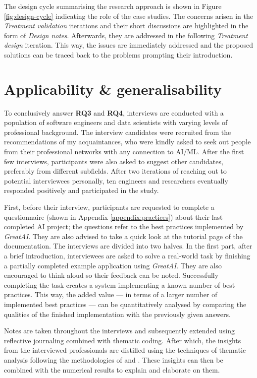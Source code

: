 The design cycle summarising the research approach is shown in Figure \ref{fig:design-cycle} indicating the role of the case studies. The concerns arisen in the \textit{Treatment validation} iterations and their short discussions are highlighted in the form of \textit{Design notes}. Afterwards, they are addressed in the following \textit{Treatment design} iteration. This way, the issues are immediately addressed and the proposed solutions can be traced back to the problems prompting their introduction.

\section{Applicability \& generalisability} \label{section:interview-setup}

To conclusively answer \textbf{RQ3} and \textbf{RQ4}, interviews are conducted with a population of software engineers and data scientists with varying levels of professional background. The interview candidates were recruited from the recommendations of my acquaintances, who were kindly asked to seek out people from their professional networks with any connection to AI/ML. After the first few interviews, participants were also asked to suggest other candidates, preferably from different subfields. After two iterations of reaching out to potential interviewees personally, ten engineers and researchers eventually responded positively and participated in the study.

First, before their interview, participants are requested to complete a questionnaire (shown in Appendix \ref{appendix:practices}) about their last completed AI project; the questions refer to the best practices implemented by \textit{GreatAI}. They are also advised to take a quick look at the tutorial page of the documentation. The interviews are divided into two halves. In the first part, after a brief introduction, interviewees are asked to solve a real-world task by finishing a partially completed example application using \textit{GreatAI}. They are also encouraged to think aloud so their feedback can be noted. Successfully completing the task creates a system implementing a known number of best practices. This way, the added value --- in terms of a larger number of implemented best practices --- can be quantitatively analysed by comparing the qualities of the finished implementation with the previously given answers. 

Notes are taken throughout the interviews and subsequently extended using reflective journaling \cite{halcomb2006verbatim} combined with thematic coding. After which, the insights from the interviewed professionals are distilled using the techniques of thematic analysis \cite{fereday2006demonstrating} following the methodologies of \cite{cruz2019catalog} and \cite{haakman2021ai}. These insights can then be combined with the numerical results to explain and elaborate on them. 

